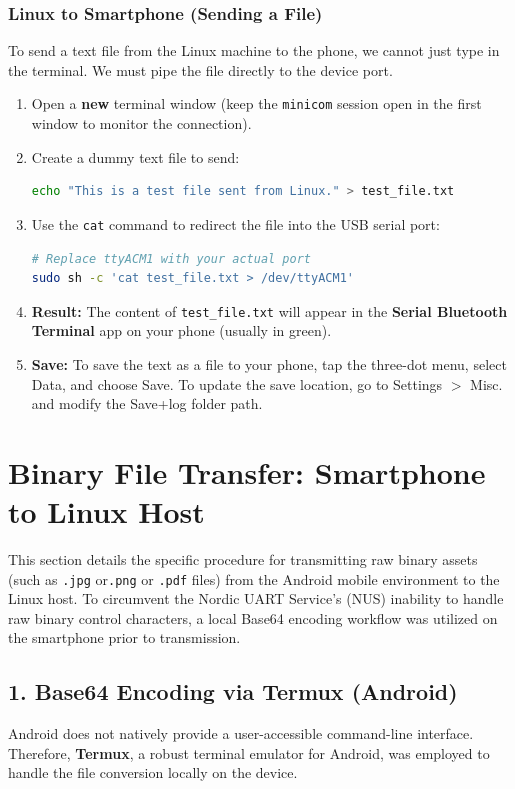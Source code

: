 \documentclass[conference]{IEEEtran}
\begin{document}
\subsubsection{Linux to Smartphone (Sending a File)}
To send a text file from the Linux machine to the phone, we cannot just type in the terminal. We must pipe the file directly to the device port.

\begin{enumerate}
    \item Open a \textbf{new} terminal window (keep the \texttt{minicom} session open in the first window to monitor the connection).
    \item Create a dummy text file to send:
\begin{lstlisting}[language=bash]
echo "This is a test file sent from Linux." > test_file.txt
\end{lstlisting}
    \item Use the \texttt{cat} command to redirect the file into the USB serial port:
\begin{lstlisting}[language=bash]
# Replace ttyACM1 with your actual port
sudo sh -c 'cat test_file.txt > /dev/ttyACM1'
\end{lstlisting}
    \item \textbf{Result:} The content of \texttt{test\_file.txt} will appear in the \textbf{Serial Bluetooth Terminal} app on your phone (usually in green).

    \item \textbf{Save:} To save the text as a file to your phone, tap the three-dot menu, select Data, and choose Save. To update the save location, go to Settings $>$ Misc. and modify the Save+log folder path.
\end{enumerate}

\section{Binary File Transfer: Smartphone to Linux Host}

This section details the specific procedure for transmitting raw binary assets (such as \texttt{.jpg} or\texttt{.png} or \texttt{.pdf} files) from the Android mobile environment to the Linux host. To circumvent the Nordic UART Service's (NUS) inability to handle raw binary control characters, a local Base64 encoding workflow was utilized on the smartphone prior to transmission.

\subsection{1. Base64 Encoding via Termux (Android)}
Android does not natively provide a user-accessible command-line interface. Therefore, \textbf{Termux}, a robust terminal emulator for Android, was employed to handle the file conversion locally on the device.
\end{document}
